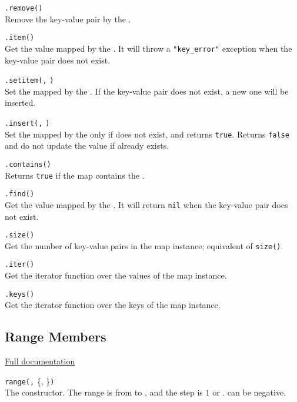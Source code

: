 \hangpar {}\texttt{.remove(}\texttt{)}\\
Remove the key-value pair by the .

\hangpar {}\texttt{.item(}\texttt{)}\\
Get the value mapped by the . It will throw a \texttt{"key\_error"} exception when the key-value pair does not exist.

\hangpar {}\texttt{.setitem(}\texttt{,} \texttt{)}\\
Set the  mapped by the . If the key-value pair does not exist, a new one will be inserted.

\hangpar {}\texttt{.insert(}\texttt{,} \texttt{)}\\
Set the  mapped by the  only if  does not exist, and returns \texttt{true}. Returns \texttt{false} and do not update the value if  already exists.

\hangpar {}\texttt{.contains(}\texttt{)}\\
Returns \texttt{true} if the map contains the .

\hangpar {}\texttt{.find(}\texttt{)}\\
Get the value mapped by the . It will return \texttt{nil} when the key-value pair does not exist.

\hangpar {}\texttt{.size()}\\
Get the number of key-value pairs in the map instance; equivalent of \texttt{size(}\texttt{)}.

\hangpar {}\texttt{.iter()}\\
Get the iterator function over the values of the map instance. 

\hangpar {}\texttt{.keys()}\\
Get the iterator function over the keys of the map instance. 

\subsection*{Range Members}

\hangpar \href{https://github.com/berry-lang/berry/wiki/Chapter-7\#range-class}{Full documentation}

\hangpar \texttt{range(}\texttt{,} \{, \}\texttt{)}\\
The constructor. The range is from  to , and the step is $1$ or .  can be negative.

